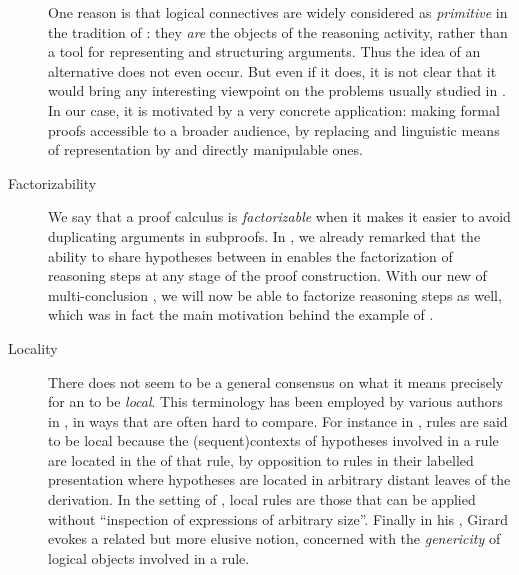 \begin{scope}
\begin{scope}
\begin{description}
    One reason is that logical connectives are widely considered as
    \emph{primitive} in the tradition of : they
    \emph{are} the objects of the reasoning activity, rather than a tool for
    representing and structuring arguments. Thus the idea of an alternative does
    not even occur. But even if it does, it is not clear that it would bring any
    interesting viewpoint on the problems usually studied in .
    In our case, it is motivated by a very concrete application: making formal
    proofs accessible to a broader audience, by replacing  and
    linguistic means of representation by  and directly manipulable
    ones.
  \item[Factorizability]
    We say that a proof calculus is \emph{factorizable} when it makes it easier
    to avoid duplicating arguments in subproofs. In , we
    already remarked that the ability to share hypotheses between 
    in  enables the factorization of \emph{} reasoning steps
    at any stage of the proof construction. With our new  of multi-conclusion , we will now be able to
    factorize \emph{} reasoning steps as well, which was in fact
    the main motivation behind the example of .
  \item[Locality]
    There does not seem to be a general consensus on what it means precisely for
    an  to be \emph{local}. This terminology has been
    employed by various authors in , in ways that are often
    hard to compare. For instance in , rules are
    said to be local because the \kl(sequent){contexts} of hypotheses involved in a rule are
    located in the  of that rule, by opposition to  rules in their labelled presentation where hypotheses are located
    in arbitrary distant leaves of the derivation. In the setting of , local rules are those that can be applied without ``inspection
    of expressions of arbitrary size''. Finally in his , Girard evokes
    a related but more elusive notion, concerned with the \emph{genericity} of
    logical objects involved in a rule.
    

\end{description}
\end{scope}
\end{scope}
